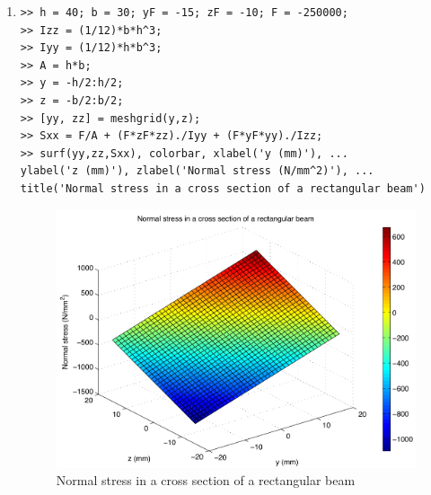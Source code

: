 \begin{enumerate}
\clearpage
\item
\begin{lstlisting}
>> h = 40; b = 30; yF = -15; zF = -10; F = -250000;
>> Izz = (1/12)*b*h^3;
>> Iyy = (1/12)*h*b^3;
>> A = h*b;
>> y = -h/2:h/2;
>> z = -b/2:b/2;
>> [yy, zz] = meshgrid(y,z);
>> Sxx = F/A + (F*zF*zz)./Iyy + (F*yF*yy)./Izz;
>> surf(yy,zz,Sxx), colorbar, xlabel('y (mm)'), ...
ylabel('z (mm)'), zlabel('Normal stress (N/mm^2)'), ...
title('Normal stress in a cross section of a rectangular beam')
\end{lstlisting}
\begin{figure}[h]
	\myfloatalign
	\includegraphics[width=\linewidth]{Graphics/Additional-Ex/3D-stress-plot}
	\caption{Normal stress in a cross section of a rectangular beam}
	\label{fig:3D-stress-plot}
\end{figure}


\end{enumerate}
